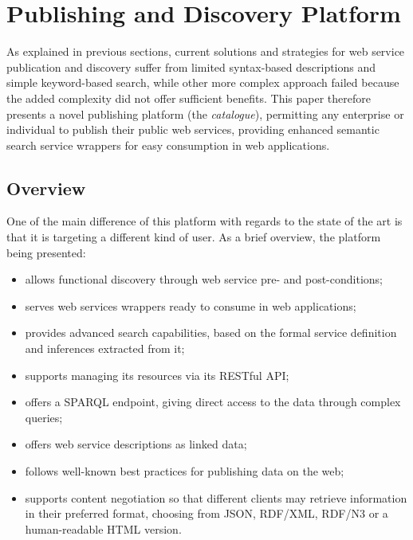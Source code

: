 
\section{Publishing and Discovery Platform}
\label{sec:discovery}

As explained in previous sections, current solutions and strategies for web service publication and discovery suffer from 
limited syntax-based descriptions and simple keyword-based search, while other more complex approach failed because the added complexity did not offer sufficient benefits. 
This paper therefore presents a novel publishing platform (the \emph{catalogue}), permitting any enterprise or individual to publish their public web services, providing enhanced semantic search service wrappers for easy consumption in web applications.

\subsection{Overview}
\label{ssec:overview}

One of the main difference of this platform with regards to the state of the art is that it is targeting a different kind of user. As a brief overview, the platform being presented:

\begin{itemize}
	\item allows functional discovery through web service pre- and post-conditions;
	\item serves web services wrappers ready to consume in web applications;
	\item provides advanced search capabilities, based on the formal service definition and inferences extracted from it;
	\item supports managing its resources via its RESTful API;
	\item offers a SPARQL endpoint, giving direct access to the data through complex queries;
	\item offers web service descriptions as linked data;
	\item follows well-known best practices for publishing data on the web;
	\item supports content negotiation so that different clients may retrieve information in their preferred format, choosing from JSON, RDF/XML, RDF/N3 or a human-readable HTML version.
\end{itemize}


